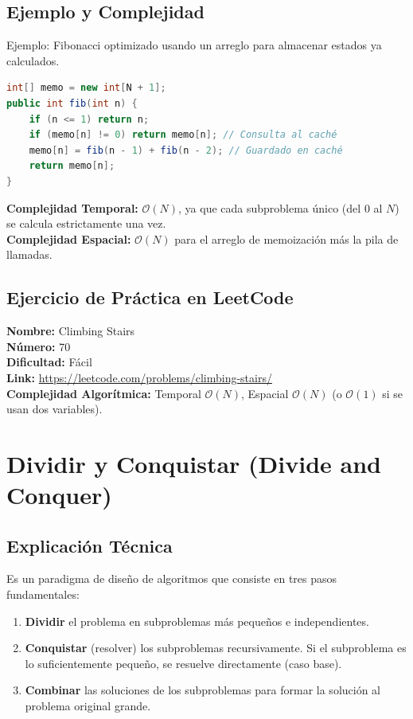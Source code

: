 \documentclass[12pt]{article}
\begin{document}
\subsection{Ejemplo y Complejidad}
Ejemplo: Fibonacci optimizado usando un arreglo para almacenar estados ya calculados.
\begin{lstlisting}[language=Java]
int[] memo = new int[N + 1];
public int fib(int n) {
    if (n <= 1) return n;
    if (memo[n] != 0) return memo[n]; // Consulta al caché
    memo[n] = fib(n - 1) + fib(n - 2); // Guardado en caché
    return memo[n];
}
\end{lstlisting}
\textbf{Complejidad Temporal:} $\mathcal{O}(N)$, ya que cada subproblema único (del $0$ al $N$) se calcula estrictamente una vez. \\
\textbf{Complejidad Espacial:} $\mathcal{O}(N)$ para el arreglo de memoización más la pila de llamadas.

\subsection{Ejercicio de Práctica en LeetCode}
\textbf{Nombre:} Climbing Stairs \\
\textbf{Número:} 70 \\
\textbf{Dificultad:} Fácil \\
\textbf{Link:} \url{https://leetcode.com/problems/climbing-stairs/} \\
\textbf{Complejidad Algorítmica:} Temporal $\mathcal{O}(N)$, Espacial $\mathcal{O}(N)$ (o $\mathcal{O}(1)$ si se usan dos variables).

\newpage
\section{Dividir y Conquistar (Divide and Conquer)}
\subsection{Explicación Técnica}
Es un paradigma de diseño de algoritmos que consiste en tres pasos fundamentales:
\begin{enumerate}
    \item \textbf{Dividir} el problema en subproblemas más pequeños e independientes.
    \item \textbf{Conquistar} (resolver) los subproblemas recursivamente. Si el subproblema es lo suficientemente pequeño, se resuelve directamente (caso base).
    \item \textbf{Combinar} las soluciones de los subproblemas para formar la solución al problema original grande.
\end{enumerate}
\end{document}
